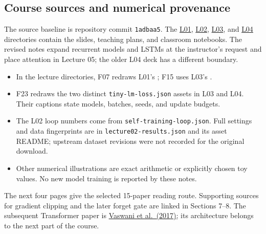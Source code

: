 \subsection*{Course sources and numerical provenance}
The source baseline is repository commit \texttt{1adbaa5}. The
\href{https://github.com/baojian/llm-26-fall/tree/1adbaa5442a567cbd2ab65035b8e485778dd46a9/slides/lecture-01}{L01},
\href{https://github.com/baojian/llm-26-fall/tree/1adbaa5442a567cbd2ab65035b8e485778dd46a9/slides/lecture-02}{L02},
\href{https://github.com/baojian/llm-26-fall/tree/1adbaa5442a567cbd2ab65035b8e485778dd46a9/slides/lecture-03}{L03}, and
\href{https://github.com/baojian/llm-26-fall/tree/1adbaa5442a567cbd2ab65035b8e485778dd46a9/slides/lecture-04}{L04}
directories contain the slides, teaching plans, and classroom notebooks.
The revised notes expand recurrent models and LSTMs at the instructor's
request and place attention in Lecture 05; the older L04 deck has a different boundary.

\begin{itemize}
\item In the lecture directories, F07 redraws L01's
; F15 uses L03's .
\item F23 redraws the two distinct \texttt{tiny-lm-loss.json} assets in
L03 and L04. Their captions state models, batches, seeds, and update budgets.
\item The L02 loop numbers come from \texttt{self-training-loop.json}.
Full settings and data fingerprints are in \texttt{lecture02-results.json}
and its asset README; upstream dataset revisions were not recorded for the original download.
\item Other numerical illustrations are exact arithmetic or explicitly
chosen toy values. No new model training is reported by these notes.
\end{itemize}

The next four pages give the selected 15-paper reading route. Supporting
sources for gradient clipping and the later forget gate are linked in
Sections 7--8. The subsequent Transformer paper is
\href{https://arxiv.org/abs/1706.03762}{Vaswani et al.\ (2017)}; its
architecture belongs to the next part of the course.
